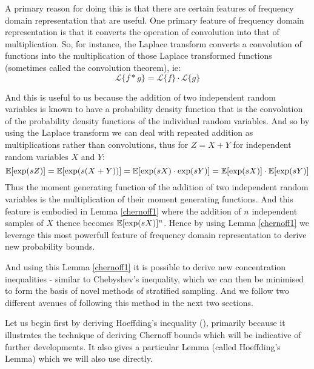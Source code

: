 A primary reason for doing this is that there are certain features of frequency domain representation that are useful. One primary feature of frequency domain representation is that it converts the operation of convolution into that of multiplication.
So, for instance, the Laplace transform converts a convolution of functions into the multiplication of those Laplace transformed functions (sometimes called the convolution theorem), ie:
$$ \mathcal{L}\{f \ast g\} = \mathcal{L}\{f\} \cdot \mathcal{L}\{g\} $$

And this is useful to us because the addition of two independent random variables is known to have a probability density function that is the convolution of the probability density functions of the individual random variables.
And so by using the Laplace transform we can deal with repeated addition as multiplications rather than convolutions, thus for $Z=X+Y$ for independent random variables $X$ and $Y$:
$$\operatorname{\mathbb{E}}[\exp(sZ)] = \operatorname{\mathbb{E}}[\exp(s(X+Y))] = \operatorname{\mathbb{E}}[\exp(sX)\cdot \exp(sY)] = \operatorname{\mathbb{E}}[\exp(sX)]\cdot\operatorname{\mathbb{E}}[\exp(sY)]$$
Thus the moment generating function of the addition of two independent random variables is the multiplication of their moment generating functions.
And this feature is embodied in Lemma \ref{chernoff1} where the addition of $n$ independent samples of $X$ thence becomes $\operatorname{\mathbb{E}}[\exp(sX)]^n$.
Hence by using Lemma \ref{chernoff1} we leverage this most powerfull feature of frequency domain representation to derive new probability bounds.


And using this Lemma \ref{chernoff1} it is possible to derive new concentration inequalities - similar to Chebyshev's inequality, which we can then be minimised to form the basis of novel methods of stratified sampling. And we follow two different avenues of following this method in the next two sections.

Let us begin first by deriving Hoeffding's inequality (\cite{hoeffding1}), primarily because it illustrates the technique of deriving Chernoff bounds which will be indicative of further developments. It also gives a particular Lemma (called Hoeffding's Lemma) which we will also use directly.

